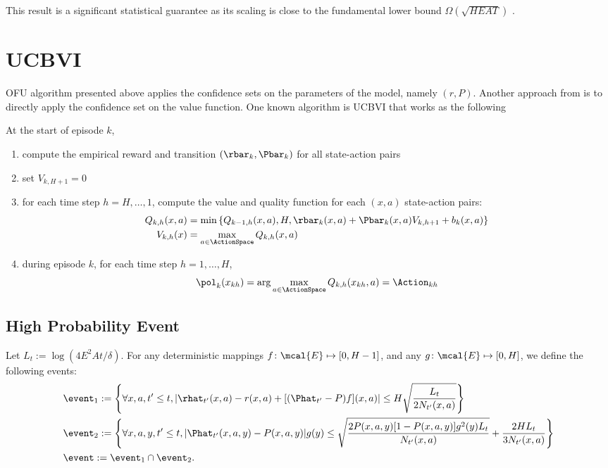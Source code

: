 This result is a significant statistical guarantee as its scaling is close to the fundamental lower bound $\Omega(\sqrt{HEAT})$ \cite{jakschNearoptimalRegretBounds; osbandLowerBoundsRegret2016}.

\section{UCBVI}
\label{sec:ucbvi}

OFU algorithm presented above applies the confidence sets on the parameters of the model, namely $(r,P)$. Another approach from \cite{gheshlaghiazarMinimaxRegretBounds2017} is to directly apply the confidence set on the value function. One known algorithm is UCBVI that works as the following

At the start of episode $k$,
\begin{enumerate}
\item compute the empirical reward and transition $(\rbar_k,\Pbar_k)$ for all state-action pairs
\item set $V_{k,H+1}=0$
\item for each time step $h=H,\dots,1$, compute the value and quality function for each $(x,a)$ state-action pairs:
\begin{align*}
Q_{k,h}(x,a) &=\min\left\{Q_{k-1,h}(x,a), H, \rbar_k(x,a) +\Pbar_k(x,a)V_{k,h+1} +b_k(x,a)\right\} \\
V_{k,h}(x) &= \max_{a\in\ActionSpace}Q_{k,h}(x,a)
\end{align*}
\item during episode $k$, for each time step $h=1,\dots,H$, 
\begin{align*}
\pol_{k}(x_{kh}) =\arg\max_{a\in\ActionSpace}Q_{k,h}(x_{kh},a)=\Action_{kh}
\end{align*}
\end{enumerate}

\subsection{High Probability Event}
\label{subsec:high_prob_event}

Let $L_t:=\log(4E^2At/\delta)$. For any deterministic mappings $f\colon \mcal{E}\mapsto[0,H-1]$, and any $g\colon\mcal{E}\mapsto[0,H]$, we define the following events:
\begin{align}
&\event_1:=\left\{\forall x, a, t'\le t,|\rhat_{t'}(x,a)-r(x,a)+[(\Phat_{t'}-P)f](x,a)| \le H\sqrt{\frac{L_t}{2N_{t'}(x,a)}}\right\} \\
&\event_2:=\left\{\forall x, a, y, t'\le t,|\Phat_{t'}(x,a,y)-P(x,a,y)|g(y) \le\sqrt{\frac{2P(x,a,y)[1-P(x,a,y)]g^2(y)L_t}{N_{t'}(x,a)}} +\frac{2HL_t}{3N_{t'}(x,a)}\right\} \\
&\event:=\event_1\cap\event_2.
\end{align}

